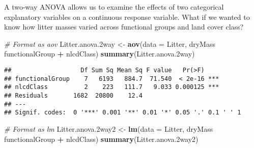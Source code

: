 \documentclass[
]{article}
\newenvironment{Shaded}{\begin{snugshade}}{\end{snugshade}}
\newcommand{\CommentTok}[1]{\textcolor[rgb]{0.56,0.35,0.01}{\textit{#1}}}
\newcommand{\DataTypeTok}[1]{\textcolor[rgb]{0.13,0.29,0.53}{#1}}
\newcommand{\FloatTok}[1]{\textcolor[rgb]{0.00,0.00,0.81}{#1}}
\newcommand{\KeywordTok}[1]{\textcolor[rgb]{0.13,0.29,0.53}{\textbf{#1}}}
\newcommand{\NormalTok}[1]{#1}
\newcommand{\OperatorTok}[1]{\textcolor[rgb]{0.81,0.36,0.00}{\textbf{#1}}}
\newcommand{\StringTok}[1]{\textcolor[rgb]{0.31,0.60,0.02}{#1}}
\begin{document}
A two-way ANOVA allows us to examine the effects of two categorical
explanatory variables on a continuous response variable. What if we
wanted to know how litter masses varied across functional groups and
land cover class?

\begin{Shaded}
\begin{Highlighting}[]
\CommentTok{# Format as aov}
\NormalTok{Litter.anova}\FloatTok{.2}\NormalTok{way <-}\StringTok{ }\KeywordTok{aov}\NormalTok{(}\DataTypeTok{data =}\NormalTok{ Litter, dryMass }\OperatorTok{~}\StringTok{ }\NormalTok{functionalGroup }\OperatorTok{+}\StringTok{ }\NormalTok{nlcdClass)}
\KeywordTok{summary}\NormalTok{(Litter.anova}\FloatTok{.2}\NormalTok{way)}
\end{Highlighting}
\end{Shaded}

\begin{verbatim}
##                   Df Sum Sq Mean Sq F value   Pr(>F)    
## functionalGroup    7   6193   884.7  71.540  < 2e-16 ***
## nlcdClass          2    223   111.7   9.033 0.000125 ***
## Residuals       1682  20800    12.4                     
## ---
## Signif. codes:  0 '***' 0.001 '**' 0.01 '*' 0.05 '.' 0.1 ' ' 1
\end{verbatim}

\begin{Shaded}
\begin{Highlighting}[]
\CommentTok{# Format as lm}
\NormalTok{Litter.anova}\FloatTok{.2}\NormalTok{way2 <-}\StringTok{ }\KeywordTok{lm}\NormalTok{(}\DataTypeTok{data =}\NormalTok{ Litter, dryMass }\OperatorTok{~}\StringTok{ }\NormalTok{functionalGroup }\OperatorTok{+}\StringTok{ }\NormalTok{nlcdClass)}
\KeywordTok{summary}\NormalTok{(Litter.anova}\FloatTok{.2}\NormalTok{way2)}
\end{Highlighting}
\end{Shaded}
\end{document}
